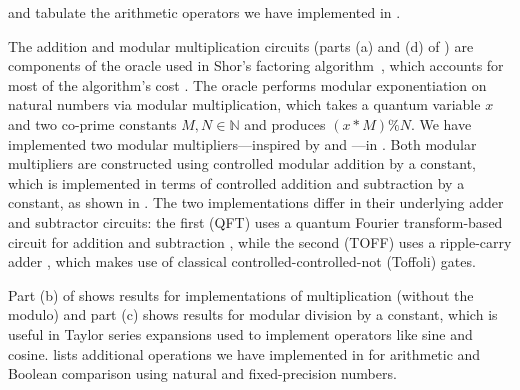  and  tabulate the
arithmetic operators we have implemented in \vqir. 

The addition and modular multiplication circuits 
(parts (a) and (d) of ) are components of the oracle used in Shor's factoring algorithm~\cite{shors}, which accounts for most of the algorithm's cost \cite{Gidney2021howtofactorbit}.
The oracle performs modular exponentiation on natural numbers via modular multiplication, which takes a quantum variable $x$ and two co-prime constants $M, N \in \mathbb{N}$ and produces $(x * M) \% N$. We have implemented two modular multipliers---inspired by \citet{qft-adder}
and \citet{ripple-carry-mod}---in \vqir. 
Both modular multipliers are constructed using controlled modular addition by a constant, which is implemented in terms of controlled addition and subtraction by a constant, as shown in .
The two implementations differ in their underlying adder and subtractor circuits: the first (QFT) uses a quantum Fourier transform-based circuit for addition and subtraction \cite{Draper2000AdditionOA}, while the second (TOFF) uses a ripple-carry adder \cite{ripple-carry-mod}, which makes use of classical controlled-controlled-not (Toffoli) gates.

Part (b) of  shows results for \oqasm implementations of multiplication (without the modulo) and part (c) shows results for modular division by a constant, which is useful in Taylor series expansions used to implement operators like sine and cosine.
 lists additional operations we have implemented in \vqir for arithmetic and Boolean comparison using natural and fixed-precision numbers.

